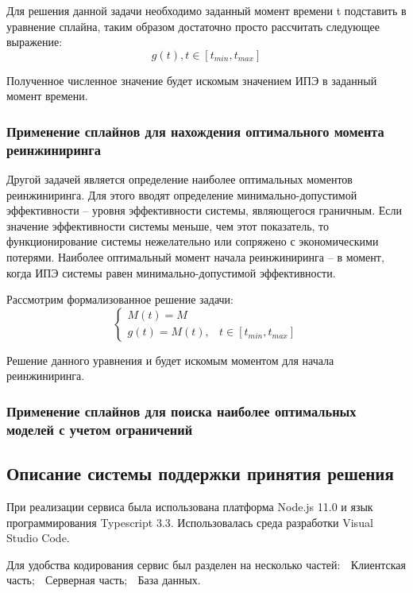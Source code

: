 Для решения данной задачи необходимо заданный момент времени t подставить в уравнение сплайна, таким образом достаточно просто рассчитать следующее выражение:
\begin{equation}
    g(t), t \in [t_{min},t_{max}]
\end{equation}

Полученное численное значение будет искомым значением ИПЭ в заданный момент времени.

\subsubsection{Применение сплайнов для нахождения оптимального момента реинжиниринга}

Другой задачей является определение наиболее оптимальных моментов реинжиниринга.
Для этого вводят определение минимально-допустимой эффективности – уровня эффективности системы, являющегося граничным. 
Если значение эффективности системы меньше, чем этот показатель, то функционирование системы нежелательно или сопряжено с экономическими потерями. 
Наиболее оптимальный момент начала реинжиниринга – в момент, когда ИПЭ системы равен минимально-допустимой эффективности.

Рассмотрим формализованное решение задачи:
\begin{equation}
    \begin{cases}
        M(t)=M  \\
        g(t)=M(t), & t \in [t_{min},t_{max}]
    \end{cases}
\end{equation}

Решение данного уравнения и будет искомым моментом для начала реинжиниринга.


\subsubsection{Применение сплайнов для поиска наиболее оптимальных моделей с учетом ограничений}

\subsection{Описание системы поддержки принятия решения}
При реализации сервиса была использована платформа Node.js 11.0 и язык программирования Typescript 3.3. 
Использовалась среда разработки Visual Studio Code.

Для удобства кодирования сервис был разделен на несколько частей:
	Клиентская часть;
	Серверная часть;
	База данных.

